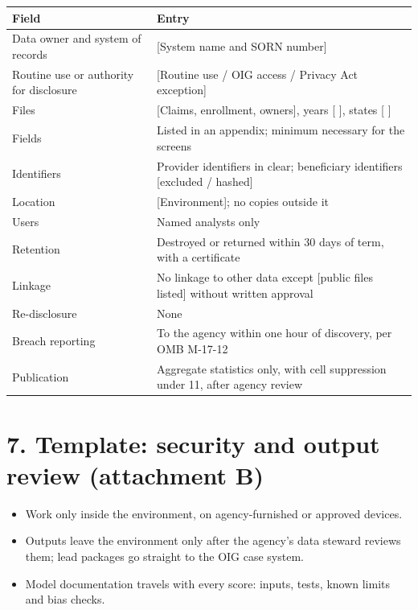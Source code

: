 \documentclass[letterpaper,11pt]{article}
\providecommand{\tightlist}{\setlength{\itemsep}{0pt}\setlength{\parskip}{0pt}}
\begin{document}
\begingroup\small\setlength{\tabcolsep}{4pt}\renewcommand{\arraystretch}{1.25}
\begin{longtable}[l]{@{}>{\raggedright\arraybackslash}p{}>{\raggedright\arraybackslash}p{}@{}}
\rowcolor{coolblack}\leavevmode\color{white}\bfseries Field & \leavevmode\color{white}\bfseries Entry \\
\endhead
Data owner and system of records & {[}System name and SORN number{]} \\
Routine use or authority for disclosure & {[}Routine use / OIG access / Privacy Act exception{]} \\
Files & {[}Claims, enrollment, owners{]}, years {[} {]}, states {[} {]} \\
Fields & Listed in an appendix; minimum necessary for the screens \\
Identifiers & Provider identifiers in clear; beneficiary identifiers {[}excluded / hashed{]} \\
Location & {[}Environment{]}; no copies outside it \\
Users & Named analysts only \\
Retention & Destroyed or returned within 30 days of term, with a certificate \\
Linkage & No linkage to other data except {[}public files listed{]} without written approval \\
Re-disclosure & None \\
Breach reporting & To the agency within one hour of discovery, per OMB M-17-12 \\
Publication & Aggregate statistics only, with cell suppression under 11, after agency review \\
\end{longtable}\endgroup

\hypertarget{template-security-and-output-review-attachment-b}{%
\section*{7. Template: security and output review (attachment
B)}\label{template-security-and-output-review-attachment-b}}

\begin{itemize}
\tightlist
\item
  Work only inside the environment, on agency-furnished or approved
  devices.
\item
  Outputs leave the environment only after the agency's data steward
  reviews them; lead packages go straight to the OIG case system.
\item
  Model documentation travels with every score: inputs, tests, known
  limits and bias checks.
\end{itemize}
\end{document}
